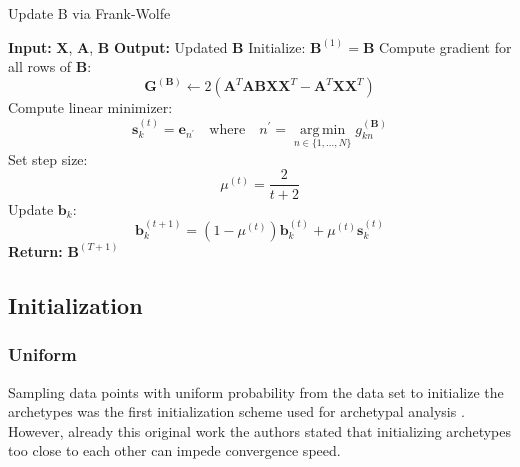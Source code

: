 \documentclass[oneside]{article}
\begin{document}
\begin{algorithm}[H]
    \caption{Update B via Frank-Wolfe}
    \label{alg:frank_wolfe_update_B}
    \begin{algorithmic}[1]
    \State \textbf{Input:} $\mathbf{X}$, $\mathbf{A}$, $\mathbf{B}$
    \State \textbf{Output:} Updated $\mathbf{B}$
    \State Initialize: $\mathbf{B}^{(1)} = \mathbf{B}$
        \State Compute gradient for all rows of $\mathbf{B}$:
        \begin{equation}
        \mathbf{G}^{(\mathbf{B})} \gets 2 \left( \mathbf{A}^T \mathbf{A} \mathbf{B} \mathbf{X} \mathbf{X}^T - \mathbf{A}^T \mathbf{X} \mathbf{X}^T \right)
        \end{equation}
            \State Compute linear minimizer:
            \begin{equation}
            \mathbf{s}_k^{(t)} = \mathbf{e}_{n^\prime} \quad \text{where} \quad n^\prime = \operatorname*{arg\,min}_{ n \in \{1, ..., N\} } g_{kn}^{(\mathbf{B})}
            \end{equation}
            \State Set step size:
            \begin{equation}
            \mu^{(t)} = \frac{2}{t+2}
            \end{equation}
            \State Update $\mathbf{b}_k$:
            \begin{equation}
            \mathbf{b}_k^{(t+1)} = (1-\mu^{(t)}) \mathbf{b}_k^{(t)} + \mu^{(t)} \mathbf{s}_k^{(t)}
            \end{equation}
        \EndFor
    \EndFor
    \State \textbf{Return:} $\mathbf{B}^{(T+1)}$
    \end{algorithmic}
\end{algorithm}

\subsection{Initialization}

\subsubsection{Uniform}

Sampling data points with uniform probability from the data set to initialize the archetypes was the first initialization scheme used for archetypal analysis \autocite{cutlerArchetypalAnalysis1994}. However, already this original work the authors stated that initializing archetypes too close to each other can impede convergence speed.
\end{document}
